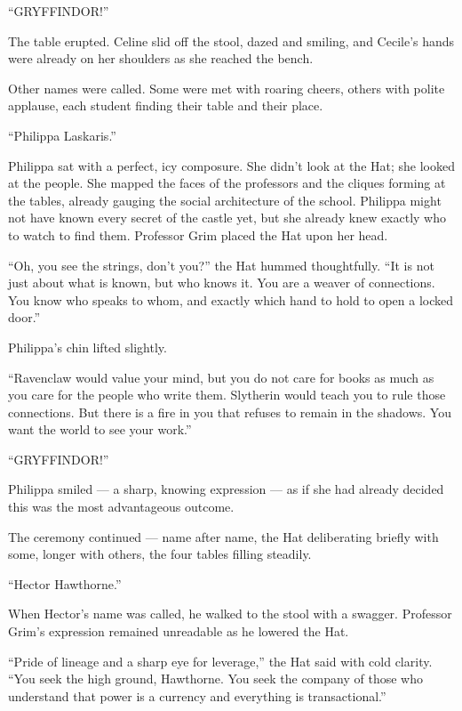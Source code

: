 \enquote{GRYFFINDOR!}

The table erupted. Celine slid off the stool, dazed and smiling, and Cecile's hands were already on her shoulders as she reached the bench.
 
Other names were called. Some were met with roaring cheers, others with polite applause, each student finding their table and their place.

\vspace{1.5\baselineskip}

\enquote{Philippa Laskaris.}

Philippa sat with a perfect, icy composure. She didn't look at the Hat; she looked at the people. She mapped the faces of the professors and the cliques forming at the tables, already gauging the social architecture of the school. Philippa might not have known every secret of the castle yet, but she already knew exactly who to watch to find them. Professor Grim placed the Hat upon her head.
 
\enquote{Oh, you see the strings, don't you?} the Hat hummed thoughtfully. \enquote{It is not just about what is known, but who knows it. You are a weaver of connections. You know who speaks to whom, and exactly which hand to hold to open a locked door.}
 
Philippa's chin lifted slightly.
 
\enquote{Ravenclaw would value your mind, but you do not care for books as much as you care for the people who write them. Slytherin would teach you to rule those connections. But there is a fire in you that refuses to remain in the shadows. You want the world to see your work.}
 
\enquote{GRYFFINDOR!}
 
Philippa smiled --- a sharp, knowing expression --- as if she had already decided this was the most advantageous outcome.
 
The ceremony continued --- name after name, the Hat deliberating briefly with some, longer with others, the four tables filling steadily.

\vspace{1.5\baselineskip}

\enquote{Hector Hawthorne.}

When Hector's name was called, he walked to the stool with a swagger. Professor Grim's expression remained unreadable as he lowered the Hat.
 
\enquote{Pride of lineage and a sharp eye for leverage,} the Hat said with cold clarity. \enquote{You seek the high ground, Hawthorne. You seek the company of those who understand that power is a currency and everything is transactional.}
 
